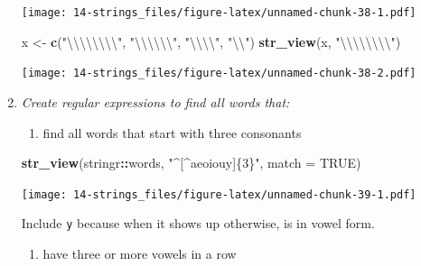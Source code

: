 \documentclass[]{book}
\newenvironment{Shaded}{\begin{snugshade}}{\end{snugshade}}
\newcommand{\CharTok}[1]{\textcolor[rgb]{0.31,0.60,0.02}{#1}}
\newcommand{\DataTypeTok}[1]{\textcolor[rgb]{0.13,0.29,0.53}{#1}}
\newcommand{\KeywordTok}[1]{\textcolor[rgb]{0.13,0.29,0.53}{\textbf{#1}}}
\newcommand{\NormalTok}[1]{#1}
\newcommand{\OperatorTok}[1]{\textcolor[rgb]{0.81,0.36,0.00}{\textbf{#1}}}
\newcommand{\OtherTok}[1]{\textcolor[rgb]{0.56,0.35,0.01}{#1}}
\newcommand{\StringTok}[1]{\textcolor[rgb]{0.31,0.60,0.02}{#1}}
\providecommand{\tightlist}{%
  \setlength{\itemsep}{0pt}\setlength{\parskip}{0pt}}
\theoremstyle{definition}
\theoremstyle{definition}
\theoremstyle{definition}
\theoremstyle{remark}
\begin{document}
\begin{enumerate}
  \texttt{[image: 14-strings\_files/figure-latex/unnamed-chunk-38-1.pdf]}

\begin{Shaded}
\begin{Highlighting}[]
\NormalTok{x <-}\StringTok{ }\KeywordTok{c}\NormalTok{(}\StringTok{"}\CharTok{\textbackslash{}\textbackslash{}\textbackslash{}\textbackslash{}\textbackslash{}\textbackslash{}\textbackslash{}\textbackslash{}}\StringTok{"}\NormalTok{, }\StringTok{"}\CharTok{\textbackslash{}\textbackslash{}\textbackslash{}\textbackslash{}\textbackslash{}\textbackslash{}}\StringTok{"}\NormalTok{, }\StringTok{"}\CharTok{\textbackslash{}\textbackslash{}\textbackslash{}\textbackslash{}}\StringTok{"}\NormalTok{, }\StringTok{"}\CharTok{\textbackslash{}\textbackslash{}}\StringTok{"}\NormalTok{)}
\KeywordTok{str_view}\NormalTok{(x, }\StringTok{"}\CharTok{\textbackslash{}\textbackslash{}\textbackslash{}\textbackslash{}\textbackslash{}\textbackslash{}\textbackslash{}\textbackslash{}}\StringTok{"}\NormalTok{)}
\end{Highlighting}
\end{Shaded}

  \texttt{[image: 14-strings\_files/figure-latex/unnamed-chunk-38-2.pdf]}
\item
  \emph{Create regular expressions to find all words that:}

  \begin{enumerate}
  \def\labelenumii{\arabic{enumii}.}
  \tightlist
  \item
    find all words that start with three consonants
  \end{enumerate}

\begin{Shaded}
\begin{Highlighting}[]
\KeywordTok{str_view}\NormalTok{(stringr}\OperatorTok{::}\NormalTok{words, }\StringTok{"^[^aeoiouy]\{3\}"}\NormalTok{, }\DataTypeTok{match =} \OtherTok{TRUE}\NormalTok{)}
\end{Highlighting}
\end{Shaded}

  \texttt{[image: 14-strings\_files/figure-latex/unnamed-chunk-39-1.pdf]}

  Include \texttt{y} because when it shows up otherwise, is in vowel
  form.

  \begin{enumerate}
  \def\labelenumii{\arabic{enumii}.}
  \setcounter{enumii}{1}
  \tightlist
  \item
    have three or more vowels in a row
  \end{enumerate}


\end{enumerate}
\end{document}
